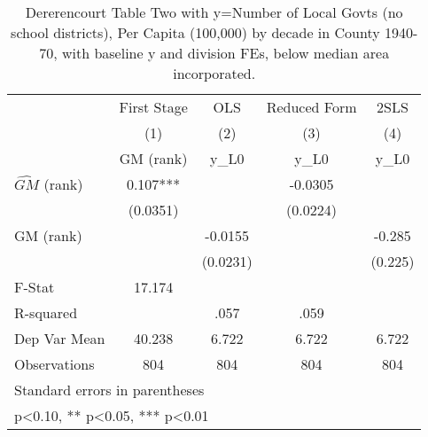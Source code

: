 \begin{table}[htbp]\centering
\def\sym#1{\ifmmode^{#1}\else\(^{#1}\)\fi}
\caption{Dererencourt Table Two with y=Number of Local Govts (no school districts), Per Capita (100,000) by decade in County 1940-70, with baseline y and division FEs, below median area incorporated.}
\begin{tabular}{l*{4}{c}}
\toprule
                    & First Stage   &         OLS   &Reduced Form   &        2SLS   \\
                    &\multicolumn{1}{c}{(1)}&\multicolumn{1}{c}{(2)}&\multicolumn{1}{c}{(3)}&\multicolumn{1}{c}{(4)}\\
                    &\multicolumn{1}{c}{GM  (rank)}&\multicolumn{1}{c}{y\_L0}&\multicolumn{1}{c}{y\_L0}&\multicolumn{1}{c}{y\_L0}\\
\midrule
$\hat{GM}$ (rank)   &       0.107***&               &     -0.0305   &               \\
                    &    (0.0351)   &               &    (0.0224)   &               \\
\addlinespace
GM  (rank)          &               &     -0.0155   &               &      -0.285   \\
                    &               &    (0.0231)   &               &     (0.225)   \\
\midrule
F-Stat              &      17.174   &               &               &               \\
R-squared           &               &        .057   &        .059   &               \\
Dep Var Mean        &      40.238   &       6.722   &       6.722   &       6.722   \\
Observations        &         804   &         804   &         804   &         804   \\
\bottomrule
\multicolumn{5}{l}{\footnotesize Standard errors in parentheses}\\
\multicolumn{5}{l}{\footnotesize * p<0.10, ** p<0.05, *** p<0.01}\\
\end{tabular}
\end{table}
